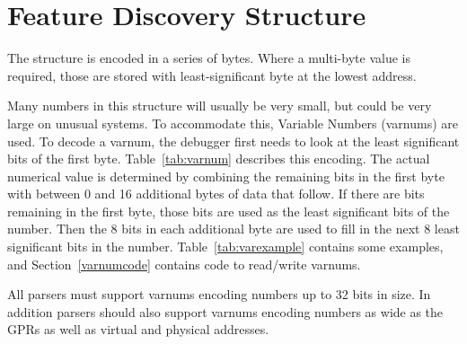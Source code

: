 

\section{Feature Discovery Structure} \label{featurestructure}

The structure is encoded in a series of bytes. Where a multi-byte value is
required, those are stored with least-significant byte at the lowest address.

  Many numbers in this structure will
usually be very small, but could be very large on unusual systems. To
accommodate this, Variable Numbers (varnums) are used. To decode a varnum, the
debugger first needs to look at the least significant bits of the first byte.
Table~\ref{tab:varnum} describes this encoding. The actual numerical value is
determined by combining the remaining bits in the first byte with between 0 and
16 additional bytes of data that follow. If there are bits remaining in the
first byte, those bits are used as the least significant bits of the number.
Then the 8 bits in each additional byte are used to fill in the next 8 least
significant bits in the number. Table~\ref{tab:varexample} contains some
examples, and Section~\ref{varnumcode} contains code to read/write varnums.

All parsers must support varnums encoding numbers up to 32 bits in size. In
addition parsers should also support varnums encoding numbers as wide as the
GPRs as well as virtual and physical addresses.

